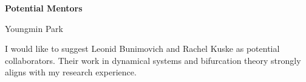 \documentclass[a4paper,11pt]{article}
\begin{document}
\begin{center}
\Large \textbf{Potential Mentors}

\Large Youngmin Park
\end{center}

I would like to suggest Leonid Bunimovich and Rachel Kuske as potential collaborators. Their work in dynamical systems and bifurcation theory strongly aligns with my research experience.
\end{document}
